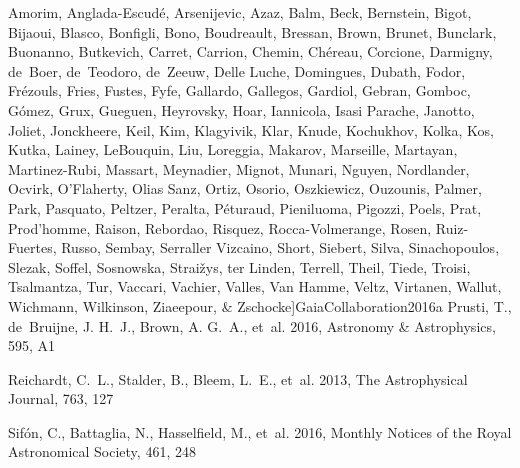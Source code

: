 \documentclass[apj, revtex4-1]{emulateapj}
\begin{document}
\begin{thebibliography}{}
{  Amorim, Anglada-Escud{\'{e}}, Arsenijevic, Azaz, Balm, Beck, Bernstein,
  Bigot, Bijaoui, Blasco, Bonfigli, Bono, Boudreault, Bressan, Brown, Brunet,
  Bunclark, Buonanno, Butkevich, Carret, Carrion, Chemin, Ch{\'{e}}reau,
  Corcione, Darmigny, de~Boer, de~Teodoro, de~Zeeuw, {Delle Luche}, Domingues,
  Dubath, Fodor, Fr{\'{e}}zouls, Fries, Fustes, Fyfe, Gallardo, Gallegos,
  Gardiol, Gebran, Gomboc, G{\'{o}}mez, Grux, Gueguen, Heyrovsky, Hoar,
  Iannicola, {Isasi Parache}, Janotto, Joliet, Jonckheere, Keil, Kim,
  Klagyivik, Klar, Knude, Kochukhov, Kolka, Kos, Kutka, Lainey, LeBouquin, Liu,
  Loreggia, Makarov, Marseille, Martayan, Martinez-Rubi, Massart, Meynadier,
  Mignot, Munari, Nguyen, Nordlander, Ocvirk, O'Flaherty, {Olias Sanz}, Ortiz,
  Osorio, Oszkiewicz, Ouzounis, Palmer, Park, Pasquato, Peltzer, Peralta,
  P{\'{e}}turaud, Pieniluoma, Pigozzi, Poels, Prat, Prod'homme, Raison,
  Rebordao, Risquez, Rocca-Volmerange, Rosen, Ruiz-Fuertes, Russo, Sembay,
  {Serraller Vizcaino}, Short, Siebert, Silva, Sinachopoulos, Slezak, Soffel,
  Sosnowska, Strai{\v{z}}ys, ter Linden, Terrell, Theil, Tiede, Troisi,
  Tsalmantza, Tur, Vaccari, Vachier, Valles, {Van Hamme}, Veltz, Virtanen,
  Wallut, Wichmann, Wilkinson, Ziaeepour, \& Zschocke}]{GaiaCollaboration2016a}
Prusti, T., de~Bruijne, J. H.~J., Brown, A. G.~A., {et~al.} 2016, Astronomy
  {\&} Astrophysics, 595, A1

Reichardt, C.~L., Stalder, B., Bleem, L.~E., {et~al.} 2013, The Astrophysical
  Journal, 763, 127

Sif{\'{o}}n, C., Battaglia, N., Hasselfield, M., {et~al.} 2016, Monthly Notices
  of the Royal Astronomical Society, 461, 248


\end{thebibliography}
\end{document}
